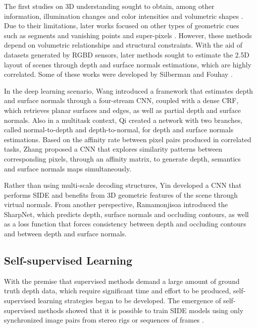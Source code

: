 \documentclass[5p]{elsarticle}
\begin{document}
The first studies on 3D understanding sought to obtain, among other information, illumination changes and color intensities \cite{zhang1999shape} and volumetric shapes \cite{binford1971visual}. Due to their limitations, later works focused on other types of geometric cues such as segments and vanishing points \cite{hoiem2007recovering} and super-pixels \cite{saxena2007learning}. However, these methods depend on volumetric relationships and structural constraints. With the aid of datasets generated by RGBD sensors, later methods sought to estimate the 2.5D layout of scenes through depth and surface normals estimations, which are highly correlated. Some of these works were developed by Silberman \etal \cite{silberman2012indoor} and Fouhay \etal \cite{fouhey2013data,fouhey2014unfolding}.

In the deep learning scenario, Wang \etal \cite{wang2016surge} introduced a framework that estimates depth and surface normals through a four-stream CNN, coupled with a dense CRF, which retrieves planar surfaces and edges, as well as partial depth and surface normals. Also in a multitask context, Qi \etal \cite{qi2018geonet} created a network with two branches, called normal-to-depth and depth-to-normal, for depth and surface normals estimations. Based on the affinity rate between pixel pairs produced in correlated tasks, Zhang \etal\cite{zhang2019pattern} proposed a CNN that explores similarity patterns between corresponding pixels, through an affinity matrix, to generate depth, semantics and surface normals maps simultaneously.

Rather than using multi-scale decoding structures, Yin \etal \cite{yin2019enforcing} developed a CNN that performs SIDE and benefits from 3D geometric features of the scene through virtual normals. From another perspective, Ramamonjisoa \etal\cite{ramamonjisoa2019sharpnet} introduced the SharpNet, which predicts depth, surface normals and occluding contours, as well as a loss function that forces consistency between depth and occluding contours and between depth and surface normals. 

\subsection{Self-supervised Learning}

With the premise that supervised methods demand a large amount of ground truth depth data, which require significant time and effort to be produced, self-supervised learning strategies began to be developed. The emergence of self-supervised methods showed that it is possible to train SIDE models using only synchronized image pairs from stereo rigs \cite{garg2016unsupervised, godard2017unsupervised, pillai2019superdepth} or sequences of frames \cite{zhou2017unsupervised}.
\end{document}
